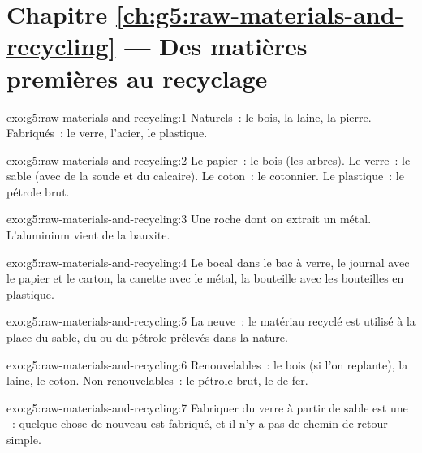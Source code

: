 \section*{Chapitre \ref{ch:g5:raw-materials-and-recycling} --- Des matières premières au recyclage}

\begin{solution}{exo:g5:raw-materials-and-recycling:1}
Naturels~: le bois, la laine, la pierre. Fabriqués~: le verre, l'acier,
le plastique.
\end{solution}

\begin{solution}{exo:g5:raw-materials-and-recycling:2}
Le papier~: le bois (les arbres). Le verre~: le sable (avec de la soude
et du calcaire). Le coton~: le cotonnier. Le plastique~: le pétrole
brut.
\end{solution}

\begin{solution}{exo:g5:raw-materials-and-recycling:3}
Une roche dont on extrait un métal. L'aluminium vient de la bauxite.
\end{solution}

\begin{solution}{exo:g5:raw-materials-and-recycling:4}
Le bocal dans le bac à verre, le journal avec le papier et le carton, la
canette avec le métal, la bouteille avec les bouteilles en plastique.
\end{solution}

\begin{solution}{exo:g5:raw-materials-and-recycling:5}
La  neuve~: le matériau recyclé est utilisé à la place
du sable, du  ou du pétrole prélevés dans la nature.
\end{solution}

\begin{solution}{exo:g5:raw-materials-and-recycling:6}
Renouvelables~: le bois (si l'on replante), la laine, le coton. Non
renouvelables~: le pétrole brut, le  de fer.
\end{solution}

\begin{solution}{exo:g5:raw-materials-and-recycling:7}
Fabriquer du verre à partir de sable est une ~:
quelque chose de nouveau est fabriqué, et il n'y a pas de chemin de
retour simple.
\end{solution}

